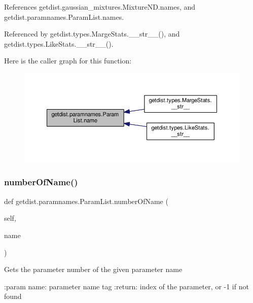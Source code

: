 References getdist.\+gaussian\+\_\+mixtures.\+Mixture\+N\+D.\+names, and getdist.\+paramnames.\+Param\+List.\+names.



Referenced by getdist.\+types.\+Marge\+Stats.\+\_\+\+\_\+str\+\_\+\+\_\+(), and getdist.\+types.\+Like\+Stats.\+\_\+\+\_\+str\+\_\+\+\_\+().

Here is the caller graph for this function\+:
\nopagebreak
\begin{figure}[H]
\begin{center}
\leavevmode
\includegraphics[width=350pt]{classgetdist_1_1paramnames_1_1ParamList_aea1705e69ca01b937e118b44e468510a_icgraph}
\end{center}
\end{figure}
\mbox{\label{classgetdist_1_1paramnames_1_1ParamList_acb31f83755b997b16c6abd4b6695ede5}} 
\subsubsection{\texorpdfstring{number\+Of\+Name()}{numberOfName()}}
{\footnotesize\ttfamily def getdist.\+paramnames.\+Param\+List.\+number\+Of\+Name (\begin{DoxyParamCaption}\item[{}]{self,  }\item[{}]{name }\end{DoxyParamCaption})}

\begin{DoxyVerb}Gets the parameter number of the given parameter name

:param name: parameter name tag
:return: index of the parameter, or -1 if not found
\end{DoxyVerb}
 

